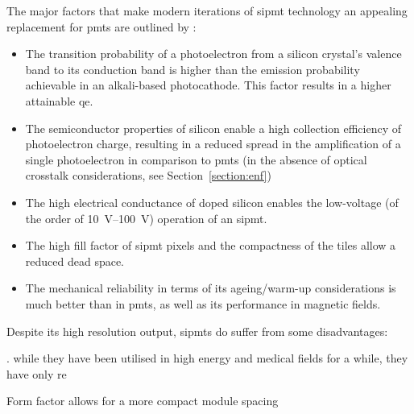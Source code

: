 The major factors that make modern iterations of \gls{sipmt} technology an appealing replacement for \glspl{pmt} are outlined by \textcite{Ghassemi2017}:
\begin{itemize}
\item The transition probability of a photoelectron from a silicon crystal’s valence band to its conduction band is higher than the emission probability achievable in an alkali-based photocathode. This factor results in a higher attainable \gls{qe}. 
\item The semiconductor properties of silicon enable a high collection efficiency of photoelectron charge, resulting in a reduced spread in the amplification of a single photoelectron in comparison to \glspl{pmt} (in the absence of optical crosstalk considerations, see Section~\ref{section:enf})
\item The high electrical conductance of doped silicon enables the low-voltage (of the order of \SIrange{10}{100}{V}) operation of an \gls{sipmt}.
\item The high fill factor of \gls{sipmt} pixels and the compactness of the tiles allow a reduced dead space.
\item The mechanical reliability in terms of its ageing/warm-up considerations is much better than in \glspl{pmt}, as well as its performance in magnetic fields.
\end{itemize}

Despite its high resolution output, \glspl{sipmt} do suffer from some disadvantages:




. while they have been utilised in high energy and medical fields for a while, they have only re

Form factor allows for a more compact module spacing 





